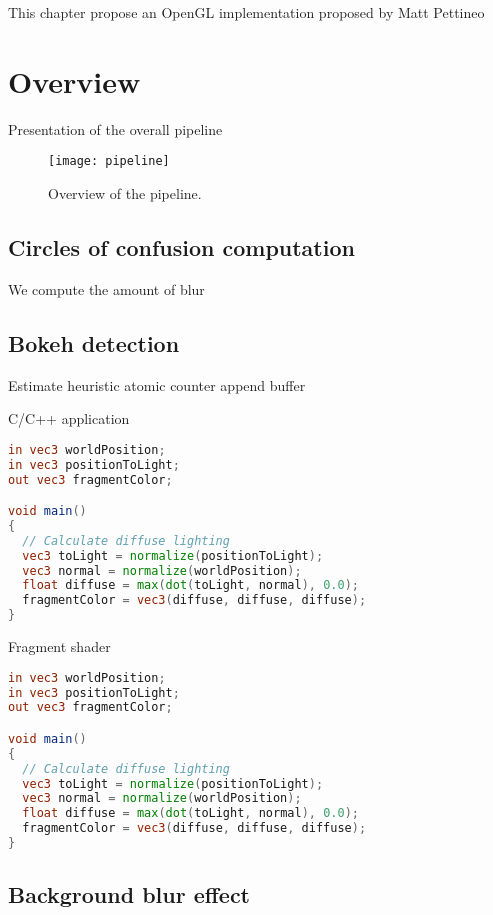 	This chapter propose an OpenGL implementation proposed by Matt Pettineo~\cite{Pettineo11}

\section{Overview}
Presentation of the overall pipeline

	\begin{figure}[htb]\centering
	\texttt{[image: pipeline]}
	\caption{Overview of the pipeline.}
	\label{YourName:fig1}
	\end{figure}

\subsection{Circles of confusion computation}
We compute the amount of blur 

\subsection{Bokeh detection}
Estimate
heuristic
atomic counter
append buffer

C/C++ application
\begin{lstlisting}[language=GLSL,float={htb},caption={Your caption.},label={YourName:listing1}]
in vec3 worldPosition;
in vec3 positionToLight;
out vec3 fragmentColor;

void main()
{
  // Calculate diffuse lighting
  vec3 toLight = normalize(positionToLight);
  vec3 normal = normalize(worldPosition);
  float diffuse = max(dot(toLight, normal), 0.0);
  fragmentColor = vec3(diffuse, diffuse, diffuse);
}
\end{lstlisting}

Fragment shader
\begin{lstlisting}[language=GLSL,float={htb},caption={Your caption.},label={YourName:listing1}]
in vec3 worldPosition;
in vec3 positionToLight;
out vec3 fragmentColor;

void main()
{
  // Calculate diffuse lighting
  vec3 toLight = normalize(positionToLight);
  vec3 normal = normalize(worldPosition);
  float diffuse = max(dot(toLight, normal), 0.0);
  fragmentColor = vec3(diffuse, diffuse, diffuse);
}
\end{lstlisting}


\subsection{Background blur effect}

